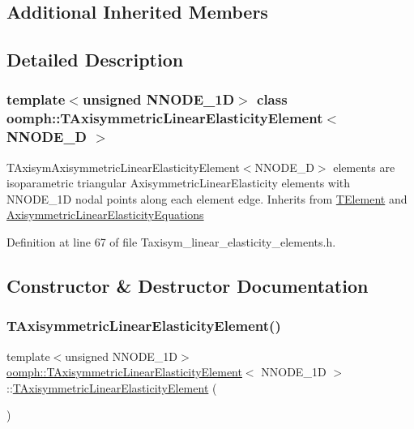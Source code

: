 \subsection*{Additional Inherited Members}


\subsection{Detailed Description}
\subsubsection*{template$<$unsigned N\+N\+O\+D\+E\+\_\+1D$>$\newline
class oomph\+::\+T\+Axisymmetric\+Linear\+Elasticity\+Element$<$ N\+N\+O\+D\+E\+\_\+D $>$}

T\+Axisym\+Axisymmetric\+Linear\+Elasticity\+Element$<$\+N\+N\+O\+D\+E\+\_\+D$>$ elements are isoparametric triangular Axisymmetric\+Linear\+Elasticity elements with N\+N\+O\+D\+E\+\_\+1D nodal points along each element edge. Inherits from \hyperlink{classoomph_1_1TElement}{T\+Element} and \hyperlink{classoomph_1_1AxisymmetricLinearElasticityEquations}{Axisymmetric\+Linear\+Elasticity\+Equations} 

Definition at line 67 of file Taxisym\+\_\+linear\+\_\+elasticity\+\_\+elements.\+h.



\subsection{Constructor \& Destructor Documentation}
\mbox{\label{classoomph_1_1TAxisymmetricLinearElasticityElement_a53d9f1f12cfa81a392b4cadff3be1e48}} 
\subsubsection{\texorpdfstring{T\+Axisymmetric\+Linear\+Elasticity\+Element()}{TAxisymmetricLinearElasticityElement()}\hspace{0.1cm}{\footnotesize\ttfamily [1/2]}}
{\footnotesize\ttfamily template$<$unsigned N\+N\+O\+D\+E\+\_\+1D$>$ \\
\hyperlink{classoomph_1_1TAxisymmetricLinearElasticityElement}{oomph\+::\+T\+Axisymmetric\+Linear\+Elasticity\+Element}$<$ N\+N\+O\+D\+E\+\_\+1D $>$\+::\hyperlink{classoomph_1_1TAxisymmetricLinearElasticityElement}{T\+Axisymmetric\+Linear\+Elasticity\+Element} (\begin{DoxyParamCaption}{ }\end{DoxyParamCaption})\hspace{0.3cm}{\ttfamily [inline]}}



